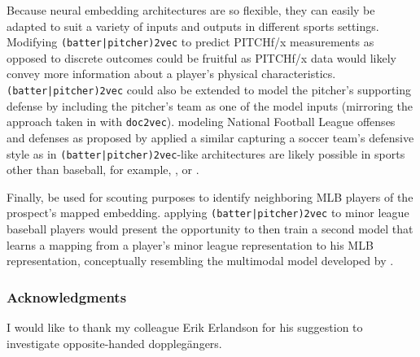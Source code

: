 \documentclass{article}
\begin{document}
Because neural embedding architectures are so flexible, they can easily be adapted to suit a variety of inputs and outputs in different sports settings. Modifying \texttt{(batter|pitcher)2vec} to predict PITCHf/x measurements as opposed to discrete outcomes could be fruitful as PITCHf/x data would likely convey more information about a player's physical characteristics. \texttt{(batter|pitcher)2vec} could also be extended to model the pitcher's supporting defense by including the pitcher's team as one of the model inputs (mirroring the approach taken in \parencite{Le2014} with \texttt{doc2vec}). modeling National Football League offenses and defenses as proposed by \parencite{Alcorn2016} \parencite{Le2017} applied a similar capturing a soccer team's defensive style as in  \texttt{(batter|pitcher)2vec}-like architectures are likely possible in sports other than baseball, for example, , or .

Finally,  be used for scouting purposes to identify neighboring MLB players of the prospect's mapped embedding. applying \texttt{(batter|pitcher)2vec} to minor league baseball players would present the opportunity to then train a second model that learns a mapping from a player's minor league representation to his MLB representation, conceptually resembling the multimodal model developed by \parencite{Ngiam2011}.

\subsubsection*{Acknowledgments}

I would like to thank my colleague Erik Erlandson for his suggestion to investigate opposite-handed dopplegängers.

\printbibliography
\end{document}
